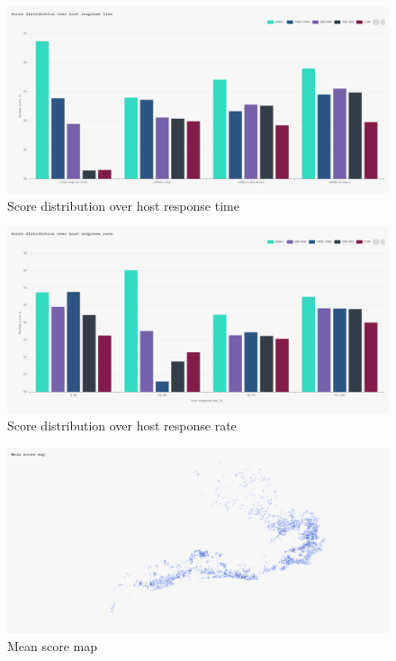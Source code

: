 \begin{figure}[H]
  \centering
  \includegraphics[width=1\textwidth]{images/q5_1.jpg}
  \caption{Score distribution over host response time}\label{fig:q5_1}
\end{figure}

\begin{figure}[H]
  \centering
  \includegraphics[width=1\textwidth]{images/q5_2.jpg}
  \caption{Score distribution over host response rate}\label{fig:q5_2}
\end{figure}

\begin{figure}[H]
  \centering
  \includegraphics[width=1\textwidth]{images/q6_1.jpg}
  \caption{Mean score map}\label{fig:q6_1}
\end{figure}

